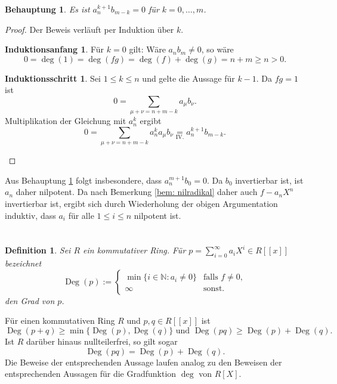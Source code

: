 \documentclass[a4paper,10pt]{article}
\newcounter{satze}
\newtheorem{beh}[satze]{Behauptung}
\newtheorem*{defi}{Definition}
\theoremstyle{definition}
\newtheorem*{ia}{Induktionsanfang}
\newtheorem*{is}{Induktionsschritt}
\newcommand{\N}{\mathbb{N}}
\newcommand{\Deg}{\operatorname{Deg}}
\begin{document}
\begin{beh}\label{beh: a_n nilpotent}
 Es ist $a_n^{k+1} b_{m-k} = 0$ für $k=0,\ldots,m$.
\end{beh}
\begin{proof}
 Der Beweis verläuft per Induktion über $k$.
 \begin{ia}Für $k=0$ gilt: Wäre $a_n b_m \neq 0$, so wäre
  \[
   0 = \deg(1) = \deg(fg) = \deg(f)+\deg(g) = n+m \geq n > 0.
  \]
 \end{ia}
 \begin{is}
 Sei $1 \leq k \leq n$ und gelte die Aussage für $k-1$. Da $fg = 1$ ist
 \[
  0 = \sum_{\mu+\nu = n+m-k} a_\mu b_\nu.
 \]
 Multiplikation der Gleichung mit $a_n^k$ ergibt
 \[
  0 = \sum_{\mu+\nu = n+m-k} a_n^k a_\mu b_\nu \underset{\text{IV.}}= a_n^{k+1} b_{m-k}.
 \]
 \end{is}
\end{proof}
Aus Behauptung \ref{beh: a_n nilpotent} folgt insbesondere, dass $a_n^{m+1} b_0 = 0$. Da $b_0$ invertierbar ist, ist $a_n$ daher nilpotent. Da nach Bemerkung \ref{bem: nilradikal} daher auch $f- a_n X^n$ invertierbar ist, ergibt sich durch Wiederholung der obigen Argumentation induktiv, dass $a_i$ für alle $1 \leq i \leq n$ nilpotent ist.










\section{}

\begin{defi}
Sei $R$ ein kommutativer Ring. Für $p = \sum_{i=0}^\infty a_i X^i \in R[\![x]\!]$ bezeichnet
\[
 \Deg(p) :=
 \begin{cases}
  \min \{i \in \N : a_i \neq 0\} & \text{falls } f \neq 0, \\
                          \infty & \text{sonst}.
 \end{cases}
\]
den Grad von $p$.
\end{defi}
Für einen kommutativen Ring $R$ und $p,q \in R[\![x]\!]$ ist
\begin{equation}\label{eq: Deg Ungleichungen}
 \Deg(p+q) \geq \min \{\Deg(p), \Deg(q)\} \text{ und }
 \Deg(pq) \geq \Deg(p) + \Deg(q).
\end{equation}
Ist $R$ darüber hinaus nullteilerfrei, so gilt sogar
\begin{equation}\label{eq: Deg nullteilerfrei}
 \Deg(pq) = \Deg(p) + \Deg(q).
\end{equation}
Die Beweise der entsprechenden Aussage laufen analog zu den Beweisen der entsprechenden Aussagen für die Gradfunktion $\deg$ von $R[X]$.
\end{document}
